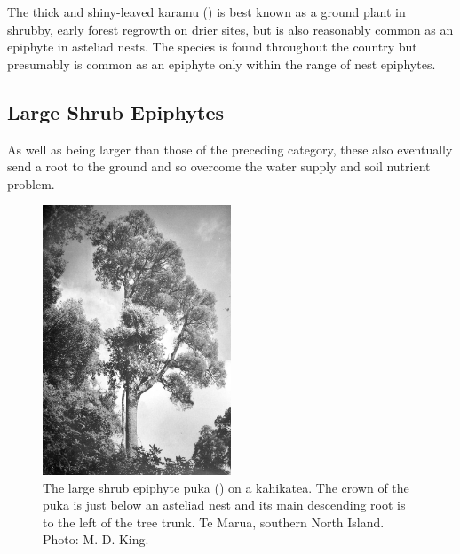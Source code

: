 The thick and shiny-leaved karamu () is best known as a ground plant in shrubby, early forest regrowth on drier sites, but is also reasonably common as an epiphyte in asteliad nests.
The species is found throughout the country but presumably is common as an epiphyte only within the range of nest epiphytes.

\subsection{Large Shrub Epiphytes}

As well as being larger than those of the preceding category, these also eventually send a root to the ground and so overcome the water supply and soil nutrient problem.

\begin{figure}
	\includegraphics[width=0.5\textwidth]{graphics/figure45puka.jpg}
	\centering
	\caption[The large shrub epiphyte puka]{The large shrub epiphyte puka () on a kahikatea.
	The crown of the puka is just below an asteliad nest and its main descending root is to the left of the tree trunk.
	Te Marua, southern North Island.
	Photo: M. D. King.}%
	\label{fig:45puka}
\end{figure}

